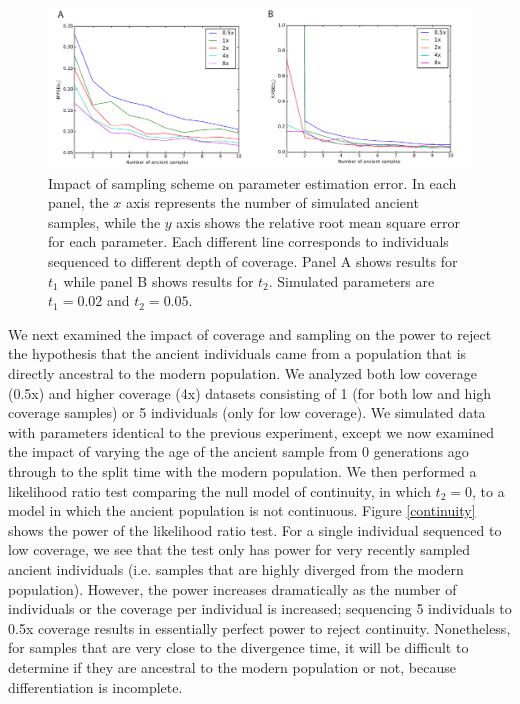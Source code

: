 \documentclass[11pt, oneside]{article}   	%
\begin{document}
\begin{figure}[h] %
   \centering
   \includegraphics[width=\textwidth]{RMSE_Figure.pdf} 
   \caption{Impact of sampling scheme on parameter estimation error. In each panel, the $x$ axis represents the number of simulated ancient samples, while the $y$ axis shows the relative root mean square error for each parameter. Each different line corresponds to individuals sequenced to different depth of coverage. Panel A shows results for $t_1$ while panel B shows results for $t_2$. Simulated parameters are $t_1 = 0.02$ and $t_2 = 0.05$.}
   \label{RMSE}
\end{figure}

We next examined the impact of coverage and sampling on the power to reject the hypothesis that the ancient individuals came from a population that is directly ancestral to the modern population. We analyzed both low coverage (0.5x) and higher coverage (4x) datasets consisting of 1 (for both low and high coverage samples) or 5 individuals (only for low coverage). We simulated data with parameters identical to the previous experiment, except we now examined the impact of varying the age of the ancient sample from 0 generations ago through to the split time with the modern population. We then performed a likelihood ratio test comparing the null model of continuity, in which $t_2 = 0$, to a model in which the ancient population is not continuous. Figure \ref{continuity} shows the power of the likelihood ratio test. For a single individual sequenced to low coverage, we see that the test only has power for very recently sampled ancient individuals (i.e. samples that are highly diverged from the modern population). However, the power increases dramatically as the number of individuals or the coverage per individual is increased; sequencing 5 individuals to 0.5x coverage results in essentially perfect power to reject continuity. Nonetheless, for samples that are very close to the divergence time, it will be difficult to determine if they are ancestral to the modern population or not, because differentiation is incomplete.
\end{document}
